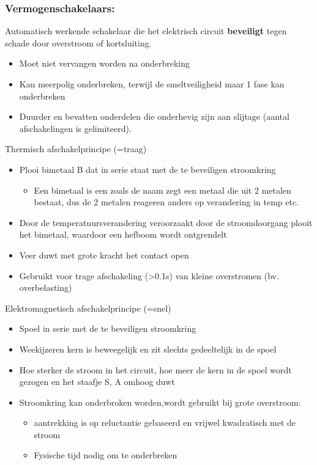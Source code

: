 \documentclass[12pt]{article}
\begin{document}
\subsubsection{Vermogenschakelaars:}
Automatisch werkende schakelaar die het elektrisch circuit \textbf{beveiligt} tegen schade door overstroom of kortsluiting.\begin{itemize}
    \item Moet niet vervangen worden na onderbreking
    \item Kan meerpolig onderbreken, terwijl de smeltveiligheid maar 1 fase kan onderbreken
    \item Duurder en bevatten onderdelen die onderhevig zijn aan slijtage (aantal afschakelingen is gelimiteerd).
\end{itemize}
Thermisch afschakelprincipe (=traag)\begin{itemize}
    \item Plooi bimetaal B dat in serie staat met de te beveiligen stroomkring\begin{itemize}
        \item Een bimetaal is een zoals de naam zegt een metaal die uit 2 metalen bestaat, dus de 2 metalen reageren anders op verandering in temp etc. 
    \end{itemize}
    \item Door de temperatuursverandering veroorzaakt door de stroomdoorgang plooit het bimetaal, waardoor een hefboom wordt ontgrendelt
    \item Veer duwt met grote kracht het contact open
    \item Gebruikt voor trage afschakeling (>0.1s) van kleine overstromen (bv. overbelasting)
\end{itemize}
Elektromagnetisch afschakelprincipe (=snel)\begin{itemize}
    \item Spoel in serie met de te beveiligen stroomkring
    \item Weekijzeren kern is beweegelijk en zit slechts gedeeltelijk in de spoel 
    \item Hoe sterker de stroom in het circuit, hoe meer de kern in de spoel wordt gezogen en het staafje S, A omhoog duwt 
    \item Stroomkring kan onderbroken worden,wordt gebruikt bij grote overstroom:\begin{itemize}
        \item aantrekking is op reluctantie gebaseerd en vrijwel kwadratisch met de stroom
        \item Fysische tijd nodig om te onderbreken
    \end{itemize}
\end{itemize}
\end{document}
